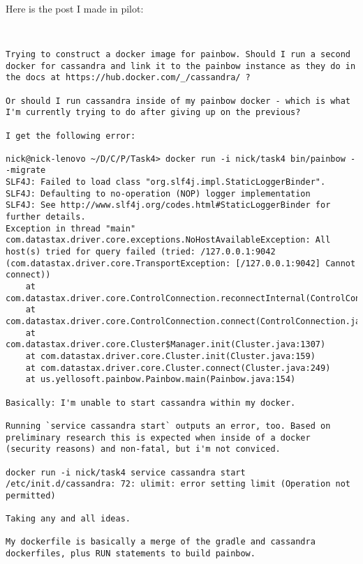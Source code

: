 \documentclass{article}
\begin{document}
Here is the post I made in pilot:
\begin{verbatim}


Trying to construct a docker image for painbow. Should I run a second docker for cassandra and link it to the painbow instance as they do in the docs at https://hub.docker.com/_/cassandra/ ?

Or should I run cassandra inside of my painbow docker - which is what I'm currently trying to do after giving up on the previous?

I get the following error:

nick@nick-lenovo ~/D/C/P/Task4> docker run -i nick/task4 bin/painbow --migrate
SLF4J: Failed to load class "org.slf4j.impl.StaticLoggerBinder".
SLF4J: Defaulting to no-operation (NOP) logger implementation
SLF4J: See http://www.slf4j.org/codes.html#StaticLoggerBinder for further details.
Exception in thread "main" com.datastax.driver.core.exceptions.NoHostAvailableException: All host(s) tried for query failed (tried: /127.0.0.1:9042 (com.datastax.driver.core.TransportException: [/127.0.0.1:9042] Cannot connect))
    at com.datastax.driver.core.ControlConnection.reconnectInternal(ControlConnection.java:227)
    at com.datastax.driver.core.ControlConnection.connect(ControlConnection.java:82)
    at com.datastax.driver.core.Cluster$Manager.init(Cluster.java:1307)
    at com.datastax.driver.core.Cluster.init(Cluster.java:159)
    at com.datastax.driver.core.Cluster.connect(Cluster.java:249)
    at us.yellosoft.painbow.Painbow.main(Painbow.java:154)

Basically: I'm unable to start cassandra within my docker.

Running `service cassandra start` outputs an error, too. Based on preliminary research this is expected when inside of a docker (security reasons) and non-fatal, but i'm not conviced.

docker run -i nick/task4 service cassandra start
/etc/init.d/cassandra: 72: ulimit: error setting limit (Operation not permitted)

Taking any and all ideas.

My dockerfile is basically a merge of the gradle and cassandra dockerfiles, plus RUN statements to build painbow.
\end{verbatim}
\end{document}
